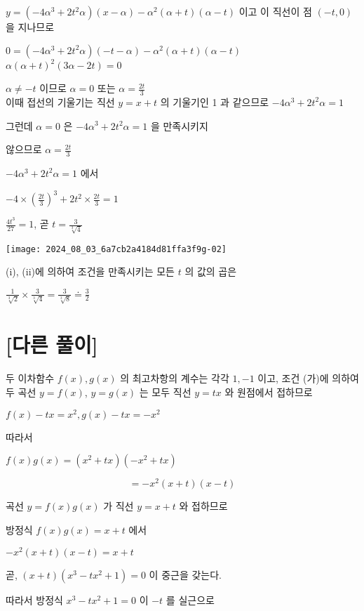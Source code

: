 \documentclass[10pt]{article}
\begin{document}
\(y=\left(-4 \alpha^{3}+2 t^{2} \alpha\right)(x-\alpha)-\alpha^{2}(\alpha+t)(\alpha-t)\) 이고 이 직선이 점 \((-t, 0)\) 을 지나므로

\(0=\left(-4 \alpha^{3}+2 t^{2} \alpha\right)(-t-\alpha)-\alpha^{2}(\alpha+t)(\alpha-t)\) \(\alpha(\alpha+t)^{2}(3 \alpha-2 t)=0\)

\(\alpha \neq-t\) 이므로 \(\alpha=0\) 또는 \(\alpha=\frac{2 t}{3}\)\\
이때 접선의 기울기는 직선 \(y=x+t\) 의 기울기인 1 과 같으므로 \(-4 \alpha^{3}+2 t^{2} \alpha=1\)

그런데 \(\alpha=0\) 은 \(-4 \alpha^{3}+2 t^{2} \alpha=1\) 을 만족시키지

않으므로 \(\alpha=\frac{2 t}{3}\)

\(-4 \alpha^{3}+2 t^{2} \alpha=1\) 에서

\(-4 \times\left(\frac{2 t}{3}\right)^{3}+2 t^{2} \times \frac{2 t}{3}=1\)

\(\frac{4 t^{3}}{27}=1\), 곧 \(t=\frac{3}{\sqrt[3]{4}}\)

\begin{center}
\texttt{[image: 2024\_08\_03\_6a7cb2a4184d81ffa3f9g-02]}
\end{center}

(i), (ii)에 의하여 조건을 만족시키는 모든 \(t\) 의 값의 곱은

\(\frac{1}{\sqrt[3]{2}} \times \frac{3}{\sqrt[3]{4}}=\frac{3}{\sqrt[3]{8}} \doteq \frac{3}{2}\)

\section*{[다른 풀이]}
두 이차함수 \(f(x), g(x)\) 의 최고차항의 계수는 각각 \(1,-1\) 이고, 조건 (가)에 의하여 두 곡선 \(y=f(x)\), \(y=g(x)\) 는 모두 직선 \(y=t x\) 와 원점에서 접하므로

\(f(x)-t x=x^{2}, g(x)-t x=-x^{2}\)

따라서

\(f(x) g(x)=\left(x^{2}+t x\right)\left(-x^{2}+t x\right)\)

\[
=-x^{2}(x+t)(x-t)
\]

곡선 \(y=f(x) g(x)\) 가 직선 \(y=x+t\) 와 접하므로

방정식 \(f(x) g(x)=x+t\) 에서

\(-x^{2}(x+t)(x-t)=x+t\)

곧, \((x+t)\left(x^{3}-t x^{2}+1\right)=0\) 이 중근을 갖는다.

따라서 방정식 \(x^{3}-t x^{2}+1=0\) 이 \(-t\) 를 실근으로
\end{document}
